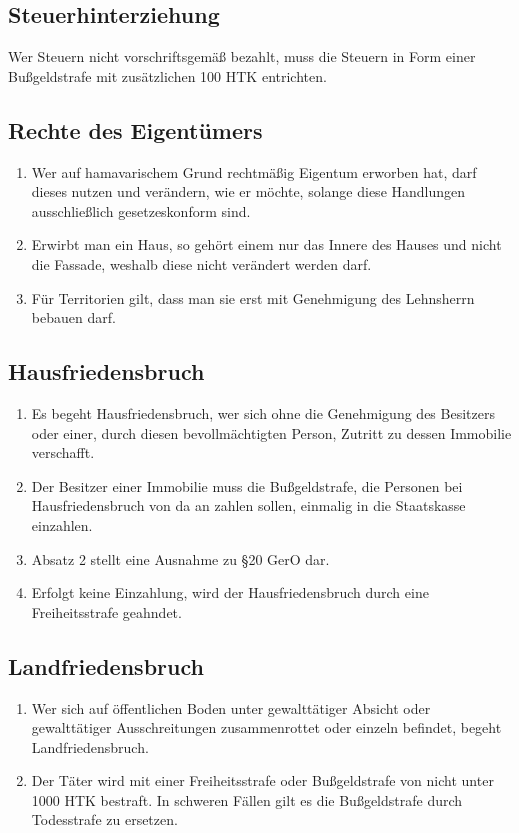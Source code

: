 \documentclass{article}
\begin{document}
\subsection{Steuerhinterziehung}\label{hinterz}
Wer Steuern nicht vorschriftsgemäß bezahlt, muss die Steuern in Form einer Bußgeldstrafe mit zusätzlichen 100 HTK entrichten.

\subsection{Rechte des Eigentümers}
\begin{enumerate}[(1)]
    \item Wer auf hamavarischem Grund rechtmäßig Eigentum erworben hat, darf dieses nutzen und verändern, wie er möchte, solange diese Handlungen ausschließlich gesetzeskonform sind.
    \item Erwirbt man ein Haus, so gehört einem nur das Innere des Hauses und nicht die Fassade, weshalb diese nicht verändert werden darf.
    \item Für Territorien gilt, dass man sie erst mit Genehmigung des Lehnsherrn bebauen darf.
\end{enumerate}

\subsection{Hausfriedensbruch}\label{hausfr}
\begin{enumerate}[(1)]
    \item Es begeht Hausfriedensbruch, wer sich ohne die Genehmigung des Besitzers oder einer, durch diesen bevollmächtigten Person, Zutritt zu dessen Immobilie verschafft.
    \item Der Besitzer einer Immobilie muss die Bußgeldstrafe, die Personen bei Hausfriedensbruch von da an zahlen sollen, einmalig in die Staatskasse einzahlen.
    \item Absatz 2 stellt eine Ausnahme zu §20 GerO dar.
    \item Erfolgt keine Einzahlung, wird der Hausfriedensbruch durch eine Freiheitsstrafe geahndet.
\end{enumerate}

\subsection{Landfriedensbruch}
\begin{enumerate}[(1)]
    \item Wer sich auf öffentlichen Boden unter gewalttätiger Absicht oder gewalttätiger Ausschreitungen zusammenrottet oder einzeln befindet, begeht Landfriedensbruch.
    \item Der Täter wird mit einer Freiheitsstrafe oder Bußgeldstrafe von nicht unter 1000 HTK bestraft. In schweren Fällen gilt es die Bußgeldstrafe durch Todesstrafe zu ersetzen.
\end{enumerate}
\end{document}
